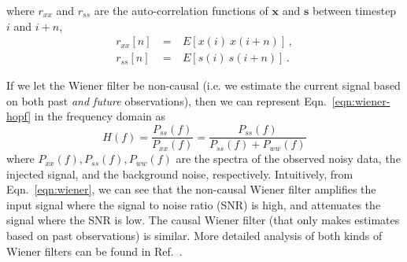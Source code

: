 \documentclass[paper-main.tex]{subfiles}
\begin{document}
where $r_{xx}$ and $r_{ss}$ are the auto-correlation functions of $\mathbf{x}$ and $\mathbf{s}$ between timestep $i$ and $i+n$, 
\begin{eqnarray} 
r_{xx}[n] &~=~& E[x(i)~x(i+n)] \,,\\
r_{ss}[n] &~=~& E[s(i)~s(i+n)] \,.
\end{eqnarray} 


If we let the Wiener filter be non-causal (i.e. we estimate the current signal based on both past \emph{and future} observations), then we can represent Eqn.~\ref{eqn:wiener-hopf} in the frequency domain as
\begin{equation}
\label{eqn:wiener}
    H(f)=\frac{P_{ss}(f)}{P_{xx}(f)}=\frac{P_{ss}(f)}{P_{ss}(f)+P_{ww}(f)}
\end{equation}
where $P_{xx}(f), P_{ss}(f), P_{ww}(f)$ are the spectra of the observed noisy data, the injected signal, and the background noise, respectively. Intuitively, from Eqn.~\ref{eqn:wiener}, we can see that the non-causal Wiener filter amplifies the input signal where the signal to noise ratio (SNR) is high, and attenuates the signal where the SNR is low. The causal Wiener filter (that only makes estimates based on past observations) is similar. More detailed analysis of both kinds of Wiener filters can be found in Ref.~\citep{10.5555/151045}.

\end{document}
